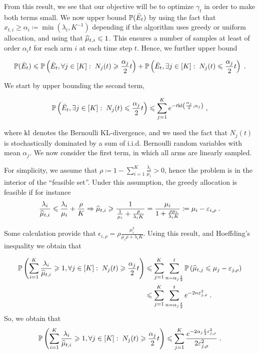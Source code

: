 From this result, we see that our objective will be to optimize $\gamma_t$ in order to make both terms small. We now upper bound $\mathbb{P}(\bar E_t)$ by using the fact that $x_{t,i}\geq \alpha_i \coloneqq \min(\lambda_i, K^{-1})$ depending if the algorithm uses greedy or uniform allocation, and using that $\widehat{\mu}_{t, i}\leqslant 1$. This ensures a number of samples at least of order $\alpha_i t$ for each arm $i$ at each time step $t$. Hence, we further upper bound 

\[\mathbb{P}(\bar E_t) \leqslant \mathbb{P}\left(\bar E_t, \forall j \in [K]:\; N_j(t)\geqslant \frac{\alpha_j}{2}t\right) + \mathbb{P}\left(\bar E_t, \exists j \in [K]:\; N_j(t)\leqslant \frac{\alpha_j}{2}t\right) \;. \]  

We start by upper bounding the second term, 

\begin{equation}\label{eq::linearly_sampled}
\mathbb{P}\left(\bar E_t, \exists j \in [K]:\; N_j(t) \leqslant  \frac{\alpha_j}{2}t\right) \leqslant \sum_{j=1}^K e^{-t \text{\normalfont kl}\left(\frac{\alpha_j}{2}, \alpha_j\right)} \;,
\end{equation}

where $\text{\normalfont kl}$ denotes the Bernoulli KL-divergence, and we used the fact that $N_j(t)$ is stochastically dominated by a sum of i.i.d. Bernoulli random variables with mean $\alpha_j$. We now consider the first term, in which all arms are linearly sampled.

For simplicity, we assume that $\rho \coloneqq 1- \sum_{i=1}^K \frac{\lambda_i}{\mu_i}>0$, hence the problem is in the interior of the ``feasible set''. Under this assumption, the greedy allocation is feasible if for instance \[\frac{\lambda_i}{\widehat{\mu}_{t, i}}\leqslant \frac{\lambda_i}{\mu_i}+ \frac{\rho}{K} \Rightarrow \widehat{\mu}_{t, i} \geqslant \frac{1}{\frac{1}{\mu_i}+\frac{\rho}{\lambda_iK}}=\frac{\mu_i}{1+\frac{\rho \mu_i}{\lambda_i K}}\coloneqq \mu_i - \varepsilon_{i, \rho}\;.\]

Some calculation provide that $\epsilon_{i, \rho}=\rho \frac{\mu_i^2}{\mu_i \rho + \lambda_i K}$. Using this result, and Hoeffding's inequality we obtain that 

\begin{align*}
\mathbb{P}\left(\sum_{i=1}^K \frac{\lambda_i}{\widehat{\mu}_{t, i}}\geqslant 1, \forall j \in [K]:\; N_j(t)\geqslant \frac{\alpha_j}{2}t\right) & \leqslant \sum_{j=1}^K \sum_{n=\alpha_j \frac{t}{2}}^t \mathbb{P}\left(\widehat{\mu}_{t,j} \leqslant \mu_j - \varepsilon_{j, \rho}\right) \\
& \leqslant \sum_{j=1}^K \sum_{n=\alpha_j \frac{t}{2}}^t e^{-2n \varepsilon_{j, \rho}^2} \;. \\
\end{align*}
So, we obtain that
\begin{equation}\label{eq::feasability_greedy}
\mathbb{P}\left(\sum_{i=1}^K \frac{\lambda_i}{\widehat{\mu}_{t, i}}\geqslant 1, \forall j \in [K]:\; N_j(t)\geqslant \frac{\alpha_j}{2}t\right) \leqslant \sum_{j=1}^K \frac{e^{-2\alpha_j \frac{t}{2} \varepsilon_{j, \rho}^2}}{2\varepsilon_{j, \rho}^2} \;.
\end{equation}

